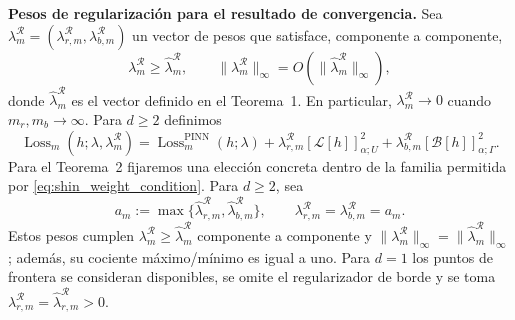 \medskip
\noindent\textbf{Pesos de regularización para el resultado de convergencia.}
Sea $\lambda_m^{\mathcal R}=(\lambda_{r,m}^{\mathcal R},\lambda_{b,m}^{\mathcal R})$ un vector de pesos que satisface, componente a componente,
\begin{equation}\label{eq:shin_weight_condition}
\lambda_m^{\mathcal R}\geq \hat\lambda_m^{\mathcal R},
\qquad
\|\lambda_m^{\mathcal R}\|_\infty
=O\!\left(\|\hat\lambda_m^{\mathcal R}\|_\infty\right),
\end{equation}
donde $\hat\lambda_m^{\mathcal R}$ es el vector definido en el Teorema~1. En particular,
$\lambda_m^{\mathcal R}\to0$ cuando $m_r,m_b\to\infty$.
Para $d\geq2$ definimos
\begin{equation}\label{eq:shin_holder_loss}
\operatorname{Loss}_m(h;\lambda,\lambda_m^{\mathcal R})
=
\operatorname{Loss}^{\mathrm{PINN}}_m(h;\lambda)
+
\lambda_{r,m}^{\mathcal R}[\mathcal L[h]]_{\alpha;U}^{2}
+
\lambda_{b,m}^{\mathcal R}[\mathcal B[h]]_{\alpha;\Gamma}^{2}.
\end{equation}
Para el Teorema~2 fijaremos una elección concreta dentro de la familia permitida por
\eqref{eq:shin_weight_condition}. Para $d\geq2$, sea
\begin{equation}\label{eq:shin_equal_weights}
a_m:=\max\{\hat\lambda_{r,m}^{\mathcal R},\hat\lambda_{b,m}^{\mathcal R}\},
\qquad
\lambda_{r,m}^{\mathcal R}=\lambda_{b,m}^{\mathcal R}=a_m.
\end{equation}
Estos pesos cumplen $\lambda_m^{\mathcal R}\geq\hat\lambda_m^{\mathcal R}$ componente a componente y
$\|\lambda_m^{\mathcal R}\|_\infty=\|\hat\lambda_m^{\mathcal R}\|_\infty$; además, su cociente
máximo/mínimo es igual a uno. Para $d=1$ los puntos de frontera se consideran disponibles,
se omite el regularizador de borde y se toma
$\lambda_{r,m}^{\mathcal R}=\hat\lambda_{r,m}^{\mathcal R}>0$.

